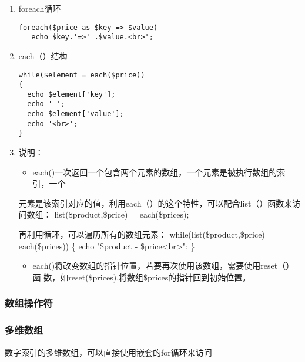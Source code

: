 \documentclass[11pt]{article}
\begin{document}
\begin{enumerate}
\item foreach循环
\label{sec:org9a977b9}
\begin{verbatim}
foreach($price as $key => $value)
   echo $key.'=>' .$value.<br>';
\end{verbatim}
\item each（）结构
\label{sec:org6e4bac8}
\begin{verbatim}
while($element = each($price))
{
  echo $element['key'];
  echo '-';
  echo $element['value'];
  echo '<br>';
}
\end{verbatim}
\item 说明：
\label{sec:orgc6571fb}
\begin{itemize}
\item each()一次返回一个包含两个元素的数组，一个元素是被执行数组的索引，一个
\end{itemize}
元素是该索引对应的值，利用each（）的这个特性，可以配合list（）函数来访
问数组：
list(\$product,\$price) = each(\$prices);

再利用循环，可以遍历所有的数组元素：
while(list(\$product,\$price) = each(\$prices))
\{
   echo "\$product - \$price<br>";
\}

\begin{itemize}
\item each()将改变数组的指针位置，若要再次使用该数组，需要使用reset（）函
数，如reset(\$prices),将数组\$prices的指针回到初始位置。
\end{itemize}
\end{enumerate}
\subsubsection{数组操作符}
\label{sec:org753ab9f}
\subsubsection{多维数组}
\label{sec:org35eb1a4}
数字索引的多维数组，可以直接使用嵌套的for循环来访问
\end{document}
